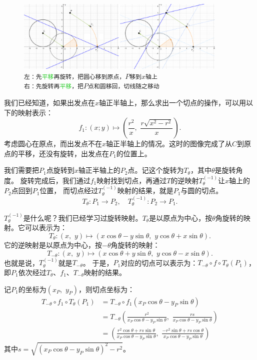 \documentclass[12pt,UTF8]{ctexbook}
\begin{document}
\begin{figure}[h]
    \vspace{4pt}
    \centering
    \includegraphics[width=0.9\textwidth]{tu/求切线变换1.png}
    \captionsetup{justification=centering}
    \caption*{\texttt{左：先\textcolor{LimeGreen}{平移}再\textcolor{YellowOrange}{旋转}，把圆心移到原点，$P$移到$x$轴上\\ 
                      右：先\textcolor{YellowOrange}{旋转}再\textcolor{LimeGreen}{平移}，把$P$点和圆移回，切线随之移动}}
\end{figure}

我们已经知道，如果出发点在$x$轴正半轴上，那么求出一个切点的操作，可以用以下的映射表示：
$$f_1: (x; y) \mapsto \left(\frac{r^2}{x},\,\, \frac{r\sqrt{x^2 - r^2}}{x}\right).$$
考虑圆心在原点，而出发点不在$x$轴正半轴上的情况。这时的图像完成了从$C$到原点的平移，还没有旋转，出发点在$P_1$的位置上。

我们需要把$P_1$点旋转到$x$轴正半轴上的$P_2$点。记这个旋转为$T_\theta$，其中$\theta$是旋转角度。
旋转完成后，我们通过$f_1$映射找到切点，再通过$T$的逆映射$T_\theta^{(-1)}$让$x$轴上的$P_2$点回到$P_1$位置，
而切点经过$T_\theta^{(-1)}$映射的结果，就是$P_1$与圆的切点。
$$T_\theta: P_1 \longrightarrow P_2, \quad T_\theta^{(-1)}: P_2 \longrightarrow P_1.$$

$T_\theta^{(-1)}$是什么呢？我们已经学习过旋转映射。$T_\theta$是以原点为中心，按$\theta$角旋转的映射。它可以表示为：
$$T_\theta: (x,\,\, y) \mapsto (x\cos{\theta} - y\sin{\theta},\,\,y\cos{\theta} + x\sin{\theta}).$$
它的逆映射是以原点为中心，按$-\theta$角旋转的映射：
$$T_{-\theta}: (x,\,\, y) \mapsto (x\cos{\theta} + y\sin{\theta},\,\,y\cos{\theta} - x\sin{\theta}).$$
也就是说，$T_\theta^{(-1)}$就是$T_{-\theta}$。
于是，$P_1$对应的切点可以表示为：$T_{-\theta}\circ f\circ T_\theta(P_1)$，即$P_1$依次经过$T_\theta$、$f_1$、$T_{-\theta}$映射的结果。

记$P_1$的坐标为$(x_P,\,\,y_P)$，则切点坐标为：
\begin{align*}
    T_{-\theta}\circ f_1\circ T_\theta(P_1) &= T_{-\theta}\circ f_1(x_P\cos{\theta} - y_P\sin{\theta})  \\
    &= T_{-\theta}\left(\frac{r^2}{x_P\cos{\theta} - y_P\sin{\theta}},\,\, \frac{rs}{x_P\cos{\theta} - y_P\sin{\theta}}\right)  \\
    &= \left(\frac{r^2\cos{\theta} + rs\sin{\theta}}{x_P\cos{\theta} - y_P\sin{\theta}},\,\, \frac{-r^2\sin{\theta} + rs\cos{\theta}}{x_P\cos{\theta} - y_P\sin{\theta}}\right) 
\end{align*}
其中$s = \sqrt{(x_P\cos{\theta} - y_P\sin{\theta})^2 - r^2}$。
\end{document}
